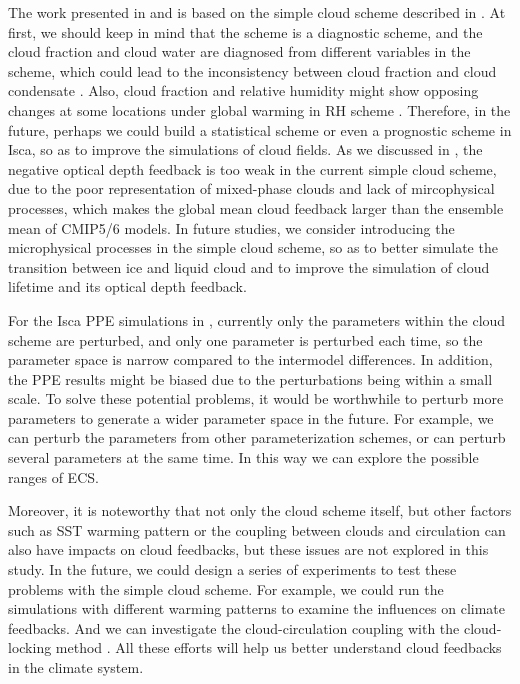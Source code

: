 
The work presented in  and  is based on the simple cloud scheme described in \cite{Liu2021simcloud}. At first, we should keep in mind that the scheme is a diagnostic scheme, and the cloud fraction and cloud water are diagnosed from different variables in the scheme, which could lead to the inconsistency between cloud fraction and cloud condensate \citep[e.g.,][]{Gregory2002,Tompkins2005}. Also, cloud fraction and relative humidity might show opposing changes at some locations under global warming in RH scheme \citep{Ming2018}. Therefore, in the future, perhaps we could build a statistical scheme or even a prognostic scheme in Isca, so as to improve the simulations of cloud fields. As we discussed in , the negative optical depth feedback is too weak in the current simple cloud scheme, due to the poor representation of mixed-phase clouds and lack of mircophysical processes, which makes the global mean cloud feedback larger than the ensemble mean of CMIP5/6 models. In future studies, we consider introducing the microphysical processes in the simple cloud scheme, so as to better simulate the transition between ice and liquid cloud and to improve the simulation of cloud lifetime and its optical depth feedback.

For the Isca PPE simulations in , currently only the parameters within the cloud scheme are perturbed, and only one parameter is perturbed each time, so the parameter space is narrow compared to the intermodel differences. In addition, the PPE results might be biased due to the perturbations being within a small scale. To solve these potential problems, it would be worthwhile to perturb more parameters to generate a wider parameter space in the future. For example, we can perturb the parameters from other parameterization schemes, or can perturb several parameters at the same time. In this way we can explore the possible ranges of ECS.

Moreover, it is noteworthy that not only the cloud scheme itself, but other factors such as SST warming pattern \citep[e.g.,][]{Zhou2016,Dong2019attributing,Dong2020intermodel} or the coupling between clouds and circulation \citep[e.g.,][]{Bony2004,Vial2013} can also have impacts on cloud feedbacks, but these issues are not explored in this study. In the future, we could design a series of experiments to test these problems with the simple cloud scheme. For example, we could run the simulations with different warming patterns to examine the influences on climate feedbacks. And we can investigate the cloud-circulation coupling with the cloud-locking method \citep[e.g.,][]{Voigt2020review}. All these efforts will help us better understand cloud feedbacks in the climate system.

